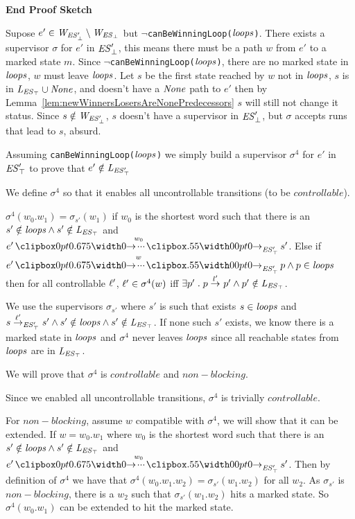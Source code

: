 \textbf{{End Proof Sketch}}

Supose $e' \in \mathit{W_{\mathit{\mathit{ES}'_{\bot}}}} \setminus \mathit{W_{\mathit{\mathit{ES}_{\bot}}}}$ but $\neg$\texttt{canBeWinningLoop($\mathit{loops}$)}.
There exists a supervisor $\sigma$ for $e'$ in $\mathit{\mathit{ES}'_{\bot}}$, this means there must be a path $w$ from $e'$ to a marked state $m$. 
Since $\neg$\texttt{canBeWinningLoop($\mathit{loops}$)}, there are no marked state in $\mathit{loops}$, $w$ must leave $\mathit{loops}$. 
Let $s$ be the first state reached by $w$ not in $\mathit{loops}$, $s$ is in $\mathit{L_{\mathit{\mathit{ES}_{\top}}}} \cup \mathit{None}$, and doesn't have a $\mathit{None}$ path to $e'$ then by Lemma~\ref{lem:newWinnersLosersAreNonePredecessors} $s$ will still not change it status.
Since $s \notin \mathit{W_{\mathit{\mathit{ES}'_{\bot}}}}$, $s$ doesn't have a supervisor in $\mathit{\mathit{ES}'_{\bot}}$, but $\sigma$ accepts runs that lead to $s$, absurd.



Assuming \texttt{canBeWinningLoop($\mathit{loops}$)} we simply build a supervisor $\sigma^4$ for $e'$ in $\mathit{\mathit{ES}'_{\top}}$ to prove that $e' \notin \mathit{L_{\mathit{\mathit{ES}'_{\top}}}}$


We define $\sigma^4$ so that it enables all uncontrollable transitions (to be $controllable$).

$\sigma^4(w_0.w_1) = \sigma_{s'}(w_1)$ if $w_0$ is the shortest word such that there is an $s' \notin \mathit{loops} \wedge s'\notin \mathit{L_{\mathit{\mathit{ES}_{\top}}}}$ and $e' \runw{w_0}{\unexploredToTop{\structure'}} s'$.
Else if $e' \runw{w}{\unexploredToTop{\structure'}} p \wedge p \in \SCC$ then for all controllable $\ell'$, $\ell' \in\sigma^4(w)$ iff $\exists  p' \;.\; p \overset{l'}{\rightarrow}_{} p' \wedge p' \notin \mathit{L_{\mathit{\mathit{ES}_{\top}}}}$.

We use the supervisors $\sigma_{s'}$ where $s'$ is such that exists $s \in \mathit{loops}$ and $s\overset{\ell'}{\rightarrow}_{\mathit{\mathit{ES}'_{\top}}} s'\wedge s' \notin \mathit{loops} \wedge s'\notin \mathit{L_{\mathit{\mathit{ES}_{\top}}}}$. If none such $s'$ exists, we know there is a marked state in $\mathit{loops}$ and $\sigma^4$ never leaves $\mathit{loops}$ since all reachable states from $\mathit{loops}$ are in $\mathit{L_{\mathit{\mathit{ES}_{\top}}}}$.



We will prove that $\sigma^4$ is $controllable$ and $non-blocking$.

Since we enabled all uncontrollable transitions, $\sigma^4$ is trivially $controllable$.

For $non-blocking$, assume $w$ compatible with $\sigma^4$, we will show that it can be extended. If $w = w_0.w_1$ where $w_0$ is the shortest word such that there is an $s' \notin \mathit{loops} \wedge s' \notin \mathit{L_{\mathit{\mathit{ES}_{\top}}}}$ and $e' \runw{w_0}{\unexploredToTop{\structure'}} s'$. Then by definition of $\sigma^4$ we have that $\sigma^4(w_0.w_1.w_2) = \sigma_{s'}(w_1.w_2)$ for all $w_2$. As $\sigma_{s'}$ is $non-blocking$, there is a $w_2$ such that $\sigma_{s'}(w_1.w_2)$ hits a marked state. So $\sigma^4(w_0.w_1)$ can be extended to hit the marked state. 

